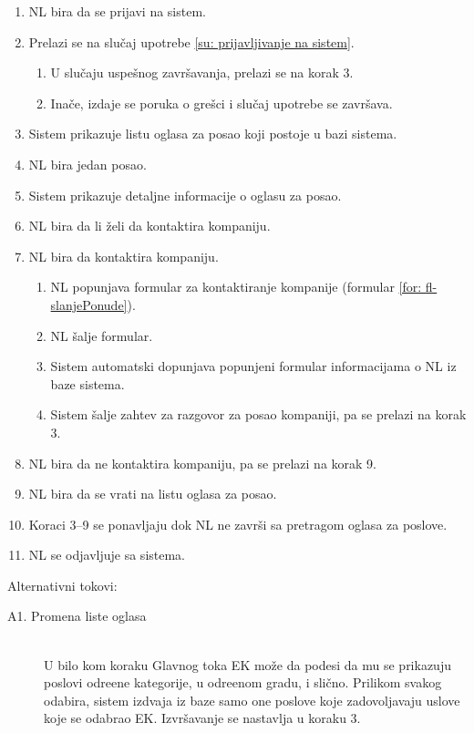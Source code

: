 \begin{enumerate}
	\item NL bira da se prijavi na sistem.
	\item Prelazi se na slu\v caj upotrebe \ref{su: prijavljivanje na sistem}.
	\begin{enumerate}
		\item U slu\v caju uspe\v snog zavr\v savanja, prelazi se na korak 3.
		\item Ina\v ce, izdaje se poruka o gre\v sci i slu\v caj upotrebe se zavr\v sava.
	\end{enumerate}
	\item Sistem prikazuje listu oglasa za posao koji postoje u bazi sistema.
	\item NL bira jedan posao.
	\item Sistem prikazuje detaljne informacije o oglasu za posao.
	\item NL bira da li \v zeli da kontaktira kompaniju.
	\item NL bira da kontaktira kompaniju.
	\begin{enumerate}
		\item NL popunjava formular za kontaktiranje kompanije (formular \ref{for: fl-slanjePonude}).
		\item NL \v salje formular.
		\item Sistem automatski dopunjava popunjeni formular informacijama o NL iz baze sistema.
		\item Sistem \v salje zahtev za razgovor za posao kompaniji, pa se prelazi na korak 3.
	\end{enumerate}
	\item NL bira da ne kontaktira kompaniju, pa se prelazi na korak 9.
	\item NL bira da se vrati na listu oglasa za posao.
	\item Koraci 3--9 se ponavljaju dok NL ne zavr\v si sa pretragom oglasa za poslove.
	\item NL se odjavljuje sa sistema.
\end{enumerate}

\noindent Alternativni tokovi: 
\begin{description}
	\item[A1. Promena liste oglasa] ~\\
		U bilo kom koraku Glavnog toka EK mo\v ze da podesi da mu se prikazuju poslovi odre\dj ene kategorije, u odre\dj enom gradu, i sli\v cno. Prilikom svakog odabira, sistem izdvaja iz baze samo one poslove koje zadovoljavaju uslove koje se odabrao EK. Izvr\v savanje se nastavlja u koraku 3.
\end{description}

